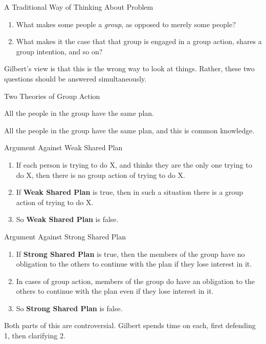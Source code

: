 \documentclass[
  ignorenonframetext,
]{beamer}
\providecommand{\tightlist}{%
  \setlength{\itemsep}{0pt}\setlength{\parskip}{0pt}}
\begin{document}
\begin{frame}{A Traditional Way of Thinking About Problem}
\protect\hypertarget{a-traditional-way-of-thinking-about-problem}{}
\begin{enumerate}
\tightlist
\item
  What makes some people a \emph{group}, as opposed to merely some
  people?
\item
  What makes it the case that that group is engaged in a group action,
  shares a group intention, and so on?
\end{enumerate}

Gilbert's view is that this is the wrong way to look at things. Rather,
these two questions should be answered simultaneously.
\end{frame}

\begin{frame}{Two Theories of Group Action}
\protect\hypertarget{two-theories-of-group-action}{}
\begin{description}
\tightlist
\item[Weak Shared Plan]
All the people in the group have the same plan.
\item[Strong Shared Plan]
All the people in the group have the same plan, and this is common
knowledge.
\end{description}
\end{frame}

\begin{frame}{Argument Against Weak Shared Plan}
\protect\hypertarget{argument-against-weak-shared-plan}{}
\begin{enumerate}
\tightlist
\item
  If each person is trying to do X, and thinks they are the only one
  trying to do X, then there is no group action of trying to do X.
\item
  If \textbf{Weak Shared Plan} is true, then in such a situation there
  is a group action of trying to do X.
\item
  So \textbf{Weak Shared Plan} is false.
\end{enumerate}
\end{frame}

\begin{frame}{Argument Against Strong Shared Plan}
\protect\hypertarget{argument-against-strong-shared-plan}{}
\begin{enumerate}
\tightlist
\item
  If \textbf{Strong Shared Plan} is true, then the members of the group
  have no obligation to the others to continue with the plan if they
  lose interest in it.
\item
  In cases of group action, members of the group do have an obligation
  to the others to continue with the plan even if they lose interest in
  it.
\item
  So \textbf{Strong Shared Plan} is false.
\end{enumerate}

Both parts of this are controversial. Gilbert spends time on each, first
defending 1, then clarifying 2.
\end{frame}
\end{document}
